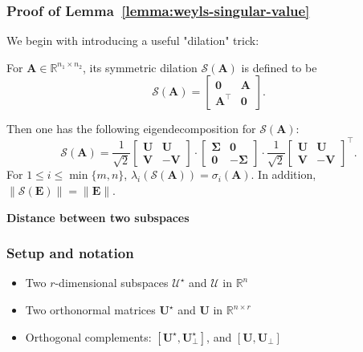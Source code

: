 \documentclass[compress,
mathserif,wide,%
]{beamer}
\begin{document}
\begin{frame}
	\frametitle{Proof of Lemma~\ref{lemma:weyls-singular-value}}
We begin with introducing a useful "dilation" trick: 
	\begin{definition}
\label{defn:sym-dilation}
For $\bm{A}\in\mathbb{R}^{n_{1}\times n_{2}}$, its symmetric dilation $\mathcal{S}(\bm{A})$ is defined to be 
%
\[
\mathcal{S}(\bm{A})=\left[\begin{array}{cc}
\bm{0} & \bm{A}\\
\bm{A}^{\top} & \bm{0}
\end{array}\right].
\]
%
 \end{definition}
 
 
 Then one has the following eigendecomposition
for $\mathcal{S}(\bm{A})$: 
\begin{equation*}
\mathcal{S}(\bm{A})=\frac{1}{\sqrt{2}}\left[\begin{array}{cc}
\bm{U} & \bm{U}\\
\bm{V} & -\bm{V}
\end{array}\right]\cdot\left[\begin{array}{cc}
\bm{\Sigma} & \bm{0}\\
\bm{0} & -\bm{\Sigma}
\end{array}\right]\cdot\frac{1}{\sqrt{2}}\left[\begin{array}{cc}
\bm{U} & \bm{U}\\
\bm{V} & -\bm{V}
\end{array}\right]^{\top}.
\end{equation*}
For $1\leq i\leq \min\{m,n\}$, $\lambda_{i}(\mathcal{S}(\bm{A})) = \sigma_{i}(\bm{A})$. In addition, $\|\mathcal{S}(\bm{E})\| = \|\bm{E}\|$.
\end{frame}



\begin{frame}[plain]

\vfill
\begin{center}
  {\Large\bf Distance between two subspaces}
\end{center}
\vfill

\end{frame}

\begin{frame}
	\frametitle{Setup and notation}
	\begin{itemize}
		\item Two $r$-dimensional subspaces $\mathcal{U}^{\star}$ and $\mathcal{U}$ in $\mathbb{R}^{n}$
		\item Two orthonormal matrices $\bm{U}^{\star}$ and $\bm{U}$ in $\mathbb{R}^{n \times r}$
		\item Orthogonal complements: $[\bm{U}^\star, \bm{U}^\star_{\perp}]$, and $[\bm{U}, \bm{U}_{\perp}]$
	\end{itemize}
\end{frame}
\end{document}
